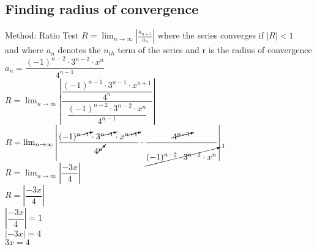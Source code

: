 \documentclass{article}
\begin{document}
\subsection*{Finding radius of convergence}
Method: Ratio Test $R =  \lim_{n\to\infty}\left| \frac{a_{n+1}}{a_n} \right|$ where the series converges if $|R|<1$
\\[0.1in]and where $a_n$ denotes the $n_{th}$ term of the series and r is the radius of convergence
\\[0.1in] $a_n= \dfrac{(-1)^{n-2}\cdot3^{n-2}\cdot x^{n}}{4^{n-1}}$
\\[0.1in] $R=\lim_{n\to\infty} \left|   \dfrac{\dfrac{(-1)^{n-1}\cdot3^{n-1}\cdot x^{n+1}}{4^{n}}}{\dfrac{(-1)^{n-2}\cdot3^{n-2}\cdot x^{n}}{4^{n-1}}}    \right|$
\\[0.1in] $R=\lim_{n\to\infty} \left|   \dfrac{(-1)^{\cancelto{}{n-1}}\cdot3^{\cancelto{}{n-1}}\cdot x^{\cancelto{}{n+1}}}{4^{\cancelto{}{n}}}\cdot \dfrac{\cancelto{}{4^{n-1}}}{\cancelto{1}{(-1)^{n-2}\cdot3^{n-2}\cdot x^{n}}}    \right|$
\\[0.1in] $R=\lim_{n\to\infty} \left|   \dfrac{-3x}{4} \right|$
\\[0.1in] $R=\left|   \dfrac{-3x}{4} \right|$
\\[0.1in] $\left|   \dfrac{-3x}{4} \right| = 1$
\\[0.1in] $\left|   -3x \right| = 4$
\\[0.1in] $3x = 4$
\\[0.1in] 
\end{document}
